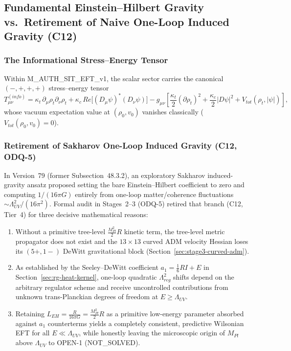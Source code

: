 \documentclass[american,11pt,letterpaper]{article}
\def\mathcal#1{#1}%
\def\mathrm#1{#1}%
\def\texttt#1{#1}%
\begin{document}
\subsection{Fundamental Einstein--Hilbert Gravity vs.\ Retirement of Naive One-Loop Induced Gravity (\texttt{C12})}

\subsubsection{The Informational Stress--Energy Tensor}

Within \texttt{M\_AUTH\_SIT\_EFT\_v1}, the scalar sector carries the canonical $(-,+,+,+)$ stress--energy tensor
\begin{equation}
T_{\mu\nu}^{(\mathrm{info})}
= \kappa_t\,\partial_\mu\rho_t\partial_\nu\rho_t
  + \kappa_c\,\mathrm{Re}\bigl[(D_\mu\psi)^*(D_\nu\psi)\bigr]
  - g_{\mu\nu}\left[\frac{\kappa_t}{2}(\partial\rho_t)^2 + \frac{\kappa_c}{2}|D\psi|^2 + V_{\mathrm{tot}}(\rho_t,|\psi|)\right],
\label{eq:info_tension_tensor_consolidated}
\end{equation}
whose vacuum expectation value at $(\rho_0, v_0)$ vanishes classically ($V_{\mathrm{tot}}(\rho_0, v_0) = 0$).

\subsubsection{Retirement of Sakharov One-Loop Induced Gravity (\texttt{C12}, \texttt{ODQ-5})}

In Version~79 (former Subsection~48.3.2), an exploratory Sakharov induced-gravity ansatz proposed setting the bare Einstein--Hilbert coefficient to zero and computing $1/(16\pi G)$ entirely from one-loop matter/coherence fluctuations $\sim \Lambda_{\mathrm{UV}}^2/(16\pi^2)$. Formal audit in Stages~2--3 (\texttt{ODQ-5}) retired that branch (\texttt{C12}, Tier~4) for three decisive mathematical reasons:
\begin{enumerate}[leftmargin=2em]
  \item Without a primitive tree-level $\frac{M_{\mathrm{Pl}}^2}{2}R$ kinetic term, the tree-level metric propagator does not exist and the $13\times 13$ curved ADM velocity Hessian loses its $(5+,1-)$ DeWitt gravitational block (Section~\ref{sec:stage3-curved-adm}).
  \item As established by the Seeley--DeWitt coefficient $a_1 = \frac{1}{6}R I + E$ in Section~\ref{sec:rg-heat-kernel}, one-loop quadratic $\Lambda_{\mathrm{reg}}^2$ shifts depend on the arbitrary regulator scheme and receive uncontrolled contributions from unknown trans-Planckian degrees of freedom at $E \ge \Lambda_{\mathrm{UV}}$.
  \item Retaining $\mathcal{L}_{\mathrm{EH}} = \frac{R}{16\pi G} = \frac{M_{\mathrm{Pl}}^2}{2}R$ as a primitive low-energy parameter absorbed against $a_1$ counterterms yields a completely consistent, predictive Wilsonian EFT for all $E \ll \Lambda_{\mathrm{UV}}$, while honestly leaving the microscopic origin of $M_{\mathrm{Pl}}$ above $\Lambda_{\mathrm{UV}}$ to \texttt{OPEN-1} (\texttt{NOT\_SOLVED}).
\end{enumerate}
\end{document}
